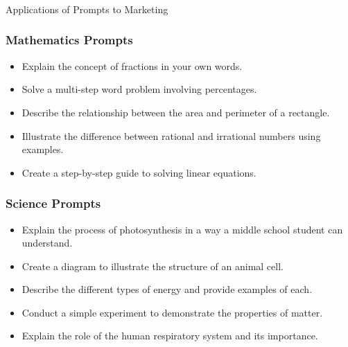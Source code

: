 
\begin{frame}[fragile]\frametitle{}
\begin{center}
{\Large Applications of Prompts to Marketing}
\end{center}
\end{frame}


\begin{frame}[fragile]\frametitle{Mathematics Prompts}
    \begin{itemize}
        \item Explain the concept of fractions in your own words.
        \item Solve a multi-step word problem involving percentages.
        \item Describe the relationship between the area and perimeter of a rectangle.
        \item Illustrate the difference between rational and irrational numbers using examples.
        \item Create a step-by-step guide to solving linear equations.
    \end{itemize}
\end{frame}

\begin{frame}[fragile]\frametitle{Science Prompts}
    \begin{itemize}
        \item Explain the process of photosynthesis in a way a middle school student can understand.
        \item Create a diagram to illustrate the structure of an animal cell.
        \item Describe the different types of energy and provide examples of each.
        \item Conduct a simple experiment to demonstrate the properties of matter.
        \item Explain the role of the human respiratory system and its importance.
    \end{itemize}
\end{frame}

